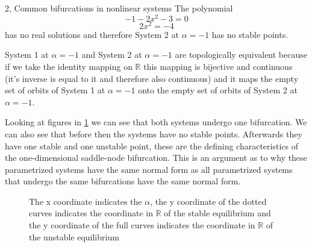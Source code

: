 \begin{task}{2, Common bifurcations in nonlinear systems}
The polynomial
$$-1 -2x^2 - 3 = 0$$
$$2x^2 = -4$$
has no real solutions
and therefore System 2 at $\alpha = -1$ has no stable points.

System 1 at $\alpha = -1$ and System 2 at $\alpha = -1$ are topologically equivalent because if we take the identity mapping on $\mathbb{R}$ this mapping is bijective and continuous (it's inverse is equal to it and therefore also continuous) and it maps the empty set of orbits of System 1 at $\alpha = -1$ onto the empty set of orbits of System 2 at $\alpha = -1$.

Looking at figures in \ref{fig:forks} we can see that both systems undergo one bifurcation. We can also see that before then the systems have no stable points. Afterwards they have one stable and one unstable point, these are the defining characteristics of the one-dimensional saddle-node bifurcation. This is an argument as to why these parametrized systems have the same normal form as all parametrized systems that undergo the same bifurcations have the same normal form.

\begin{figure}[H]
    \centering
    \caption{The x coordinate indicates the $\alpha$, the y coordinate of the dotted curves indicates the coordinate in $\mathbb{R}$ of the stable equilibrium and the y coordinate of the full curves indicates the coordinate in $\mathbb{R}$ of the unstable equilibrium}
    \label{fig:forks}
\end{figure}

\end{task}